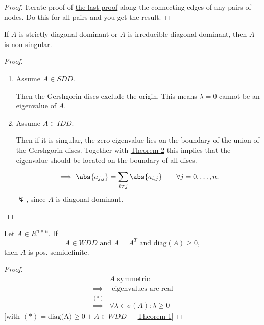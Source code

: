 \begin{proof}
\label{thm:gershgorinboundaryproof}
	Iterate proof of \href{thm:gershgorinproof}{the last proof} along the connecting edges of any pairs of nodes. Do this for all pairs and you get the result.
\end{proof}

\begin{corollary}
\label{thm:gershgorinboundarycorollary1}
	If $A$ is strictly diagonal dominant or $A$ is irreducible diagonal dominant, then $A$ is non-singular.
\end{corollary}

\begin{proof}
\label{thm:gershgorinboundarycorollary1proof}
	\begin{enumerate}[label=\alph{enumi})]
		\item Assume $A \in SDD$.

			Then the Gershgorin discs exclude the origin. This means $\lambda =0$ cannot be an eigenvalue of $A$.

		\item Assume $A \in IDD$.

			Then if it is singular, the zero eigenvalue lies on the boundary of the union of the Gershgorin discs. Together with \href{thm:gershgorinboundary}{Theorem 2} this implies that the eigenvalue should be located on the boundary of all discs.
			\[
				\implies \abs{a_{j,j}} = \sum_{i \neq j}^{}{\abs{a_{i,j}} } \qquad \forall j=0, \ldots , n
			.\] 
			$\lightning$, since $A$ is diagonal dominant.
	\end{enumerate}
\end{proof}

\begin{corollary}
\label{thm:gershgorinboundarycorollary2}
	Let $A \in R^{n \times  n}$. If 
	\[
		A \in WDD \text{ and } A = A^{T} \text{ and } \text{diag}(A) \geq 0
	,\] 
	then $A$ is pos. semidefinite. 
\end{corollary}

\begin{proof}
\label{thm:gershgorinboundarycorollary2proof}
\begin{align*}
& A \text{ symmetric} \\
	\implies & \text{ eigenvalues are real} \\
	\overset{(\ast)}{\implies} & \forall \lambda  \in \sigma (A) : \lambda  \geq 0
\end{align*}
[with $(\ast) = \text{diag(A)} \geq 0 + A \in WDD + $ \href{thm:gershgorin}{Theorem 1}] 
\end{proof}

